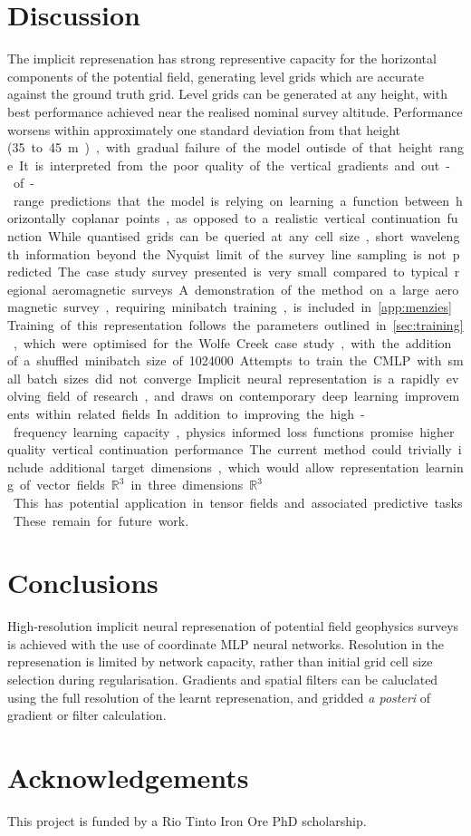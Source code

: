 \documentclass[manuscript.tex]{subfiles}
\begin{document}
\section{Discussion}
The implicit represenation has strong representive capacity for the horizontal components of the potential field, generating level grids which are accurate against the ground truth grid.
Level grids can be generated at any height, with best performance achieved near the realised nominal survey altitude.
Performance worsens within approximately one standard deviation from that height (\SI{35} to \SI{45}{\m}), with gradual failure of the model outisde of that height range.
It is interpreted from the poor quality of the vertical gradients and out-of-range predictions that the model is relying on learning a function between horizontally coplanar points, as opposed to a realistic vertical continuation function.
While quantised grids can be queried at any cell size, short wavelength information beyond the Nyquist limit of the survey line sampling is not predicted.

The case study survey presented is very small compared to typical regional aeromagnetic surveys.
A demonstration of the method on a large aeromagnetic survey, requiring minibatch training, is included in \cref{app:menzies}.
Training of this representation follows the parameters outlined in \cref{sec:training}, which were optimised for the Wolfe Creek case study, with the addition of a shuffled minibatch size of \SI{1024000}.
Attempts to train the CMLP with small batch sizes did not converge.%

Implicit neural representation is a rapidly evolving field of research, and draws on contemporary deep learning improvements within related fields.
In addition to improving the high-frequency learning capacity, physics informed loss functions promise higher quality vertical continuation performance. 
The current method could trivially include additional target dimensions, which would allow representation learning of vector fields \(\mathbb{R}^{3}\) in three dimensions \(\mathbb{R}^{3}\).
This has potential application in tensor fields and associated predictive tasks.
These remain for future work.

\section{Conclusions}
High-resolution implicit neural represenation of potential field geophysics surveys is achieved with the use of coordinate MLP neural networks.
Resolution in the represenation is limited by network capacity, rather than initial grid cell size selection during regularisation.
Gradients and spatial filters can be caluclated using the full resolution of the learnt represenation, and gridded \emph{a posteri} of gradient or filter calculation.


\section{Acknowledgements}
This project is funded by a Rio Tinto Iron Ore PhD scholarship.

\printbibliography{}
\end{document}

